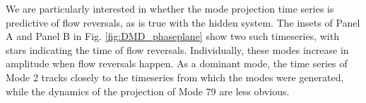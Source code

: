 We are particularly interested in whether the mode projection time series is predictive of flow reversals, as is true with the hidden system.
The insets of Panel A and Panel B in Fig. \ref{fig:DMD_phaseplane} show two such timeseries, with stars indicating the time of flow reversals.
Individually, these modes increase in amplitude when flow reversals happen.
As a dominant mode, the time series of Mode 2 tracks closely to the timeseries from which the modes were generated, while the dynamics of the projection of Mode 79 are less obvious.


